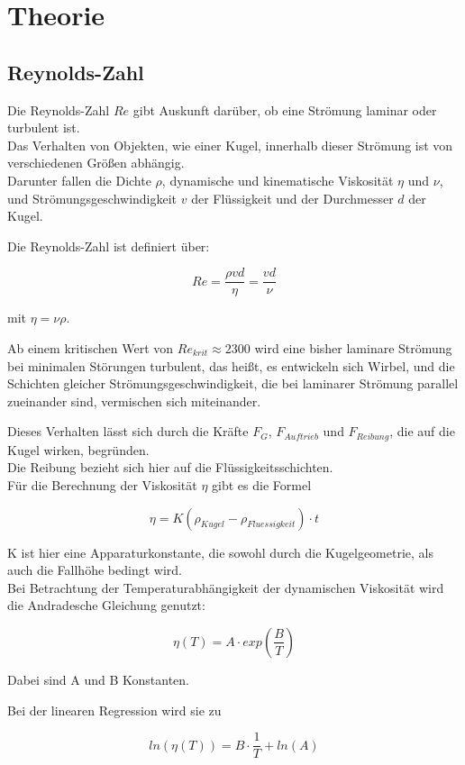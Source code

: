 \section{Theorie}
\label{sec:Theorie}

\subsection{Reynolds-Zahl}
\label{subsec:Reynolds-Zahl}

Die Reynolds-Zahl $Re$ gibt Auskunft darüber, ob eine Strömung laminar oder turbulent ist. \\
Das Verhalten von Objekten, wie einer Kugel, innerhalb dieser Strömung ist von verschiedenen Größen abhängig.\\
Darunter fallen die Dichte $\rho$, dynamische und kinematische Viskosität $\eta$ und $\nu$, 
und Strömungsgeschwindigkeit $v$ der Flüssigkeit 
und der Durchmesser $d$ der Kugel.

Die Reynolds-Zahl ist definiert über: 

\begin{equation}
    Re = \frac{\rho v d }{\eta} = \frac{v d }{\nu}
\end{equation}

mit $\eta = \nu \rho$.

Ab einem kritischen Wert von $Re_{krit} \approx 2300$ wird eine bisher laminare Strömung bei 
minimalen Störungen turbulent, das heißt, es entwickeln sich Wirbel, und die Schichten gleicher Strömungsgeschwindigkeit, 
die bei laminarer Strömung parallel zueinander sind, vermischen sich miteinander.

Dieses Verhalten lässt sich durch die Kräfte $F_G$, $F_{Auftrieb}$ und $F_{Reibung}$, die auf die Kugel wirken, begründen.\\
Die Reibung bezieht sich hier auf die Flüssigkeitsschichten. \\

Für die Berechnung der Viskosität $\eta$ gibt es die Formel 

\begin{equation}
    \eta = K (\rho_{Kugel} - \rho_{Fluessigkeit}) \cdot t
\end{equation}

K ist hier eine Apparaturkonstante, die sowohl durch die Kugelgeometrie, als auch die Fallhöhe bedingt wird.\\



Bei Betrachtung der Temperaturabhängigkeit der dynamischen Viskosität wird die Andradesche Gleichung genutzt:

\begin{equation}
    \eta(T) = A \cdot exp(\frac{B}{T})
\end{equation}

Dabei sind A und B Konstanten.

Bei der linearen Regression wird sie zu

\begin{equation}
    ln(\eta(T)) = B \cdot \frac{1}{T} + ln(A)
\end{equation}




\cite{sample}
